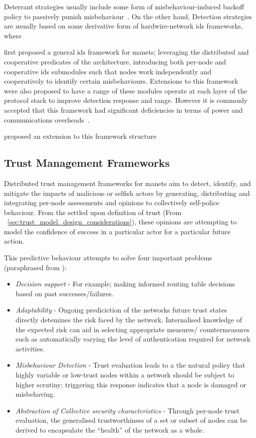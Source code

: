 Deterrant strategies usually include some form of misbehaviour-induced backoff policy to passively punish misbehaviour~\cite{Konorski2002}\cite{Cardenas:2004:DPM:1029102.1029107}.
On the other hand, Detection strategies are usually based on some derivative form of hardwire-network \gls{ids} frameworks, where 

\citet{zhang2003intrusion} first proposed a general \gls{ids} framework for \glspl{manet}; leveraging the distributed and cooperative predicates of the architecture, introducing both per-node and cooperative \gls{ids} submodules such that nodes work independently and cooperatively to identify certain misbehaviours.
Extensions to this framework were also proposed to have a range of these modules operate at each layer of the protocol stack to improve detection response and range.
However it is commonly accepted that this framework had significant deficiencies in terms of power and communications overheads~\cite{csen2010security}.

\citet{Parker2006} proposed an extension to this framework structure 

\subsection{Trust Management Frameworks}\label{sec:tmfs}

Distributed trust management frameworks for \glspl{manet} aim to detect, identify, and mitigate the impacts of malicious or selfish actors by generating, distributing and integrating per-node assessments and opinions to collectively self-police behaviour.
From the settled upon definition of trust (From ~\autoref{sec:trust_model_design_considerations}), these opinions are attempting to model the confidence of success in a particular actor for a particular future action.

This predictive behaviour attempts to solve four important problems (paraphrased from \cite{Sun2008}):
\begin{itemize}
  \item \emph{Decision support} - For example; making informed routing table decisions based on past successes/failures.
  \item \emph{Adaptability} - Ongoing prediciction of the networks future trust states directly detemines the risk faced by the network. Internalised knowledge of the expected risk can aid in selecting appropriate measures/ countermeasures such as automatically varying the level of authentication required for network activities.
  \item \emph{Misbehaviour Detection} - Trust evaluation leads to a the natural policy that highly variable or low-trust nodes within a network should be subject to higher scrutiny; triggering this response indicates that a node is damaged or misbehaving.
  \item \emph{Abstraction of Collective security characteristics} - Through per-node trust evaluation, the generalised trustworthiness of a set or subset of nodes can be derived to encapsulate the ``health'' of the network as a whole.
\end{itemize}


